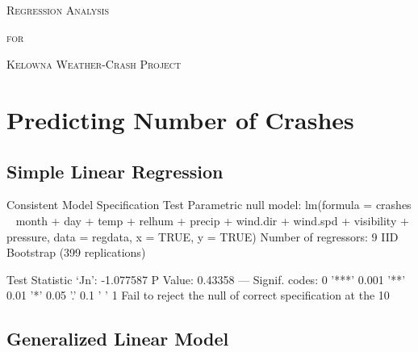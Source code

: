 \documentclass[11pt, a4paper]{article}
\begin{document}


\begin{center}
\Large{\textsc{Regression Analysis}}
\par
\normalsize{\textsc{for}}
\par
\large{\textsc{Kelowna Weather-Crash Project}}
\end{center}


\vspace{0.917 pc} %

\tableofcontents



\pagebreak
\section{Predicting Number of Crashes}



\subsection{Simple Linear Regression}





\begin{Schunk}
\begin{Soutput}
Consistent Model Specification Test
Parametric null model: lm(formula = crashes ~ month + day + temp + relhum +
                          precip + wind.dir + wind.spd + visibility + pressure,
                          data = regdata, x = TRUE, y = TRUE)
Number of regressors: 9
IID Bootstrap (399 replications)

Test Statistic ‘Jn’: -1.077587	P Value: 0.43358  
---
Signif. codes:  0 '***' 0.001 '**' 0.01 '*' 0.05 '.' 0.1 ' ' 1
Fail to reject the null of correct specification at the 10%
\end{Soutput}
\end{Schunk}




\pagebreak
\subsection{Generalized Linear Model}
\end{document}
